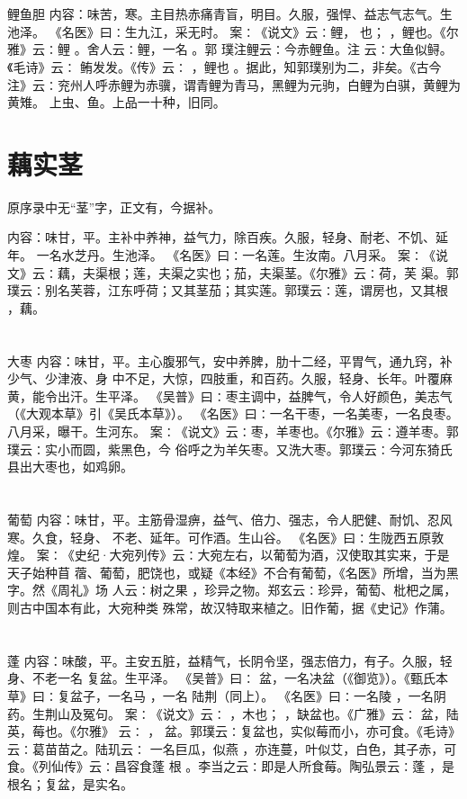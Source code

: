 \documentclass[12pt,UTF8]{ctexbook}
\begin{document}
\section{}鲤鱼胆
内容：味苦，寒。主目热赤痛青盲，明目。久服，强悍、益志气志气。生池泽。 
《名医》曰∶生九江，采无时。 
案∶《说文》云∶鲤， 也； ，鲤也。《尔雅》云∶鲤 。舍人云∶鲤，一名 。郭 
璞注鲤云∶今赤鲤鱼。注 云∶大鱼似鲟。《毛诗》云∶ 鲔发发。《传》云∶ ，鲤也 
。据此，知郭璞别为二，非矣。《古今 
注》云∶兖州人呼赤鲤为赤骥，谓青鲤为青马，黑鲤为元驹，白鲤为白骐，黄鲤为黄雉。 
上虫、鱼。上品一十种，旧同。 


\section{藕实茎}

原序录中无“茎”字，正文有，今据补。

内容：味甘，平。主补中养神，益气力，除百疾。久服，轻身、耐老、不饥、延年。 
一名水芝丹。生池泽。 
《名医》曰∶一名莲。生汝南。八月采。 
案∶《说文》云∶藕，夫渠根；莲，夫渠之实也；茄，夫渠茎。《尔雅》云∶荷，芙 
渠。郭璞云∶别名芙蓉，江东呼荷；又其茎茄；其实莲。郭璞云∶莲，谓房也，又其根 
，藕。 


\section{}大枣
内容：味甘，平。主心腹邪气，安中养脾，肋十二经，平胃气，通九窍，补少气、少津液、身 
中不足，大惊，四肢重，和百药。久服，轻身、长年。叶覆麻黄，能令出汗。生平泽。 
《吴普》曰∶枣主调中，益脾气，令人好颜色，美志气（《大观本草》引《吴氏本草》）。 
《名医》曰∶一名干枣，一名美枣，一名良枣。八月采，曝干。生河东。 
案∶《说文》云∶枣，羊枣也。《尔雅》云∶遵羊枣。郭璞云∶实小而圆，紫黑色，今 
俗呼之为羊矢枣。又洗大枣。郭璞云∶今河东猗氏县出大枣也，如鸡卵。 


\section{}葡萄
内容：味甘，平。主筋骨湿痹，益气、倍力、强志，令人肥健、耐饥、忍风寒。久食，轻身、 
不老、延年。可作酒。生山谷。 
《名医》曰∶生陇西五原敦煌。 
案∶《史纪·大宛列传》云∶大宛左右，以葡萄为酒，汉使取其实来，于是天子始种苜 
蓿、葡萄，肥饶也，或疑《本经》不合有葡萄，《名医》所增，当为黑字。然《周礼》场 
人云∶树之果 ，珍异之物。郑玄云∶珍异，葡萄、枇杷之属，则古中国本有此，大宛种类 
殊常，故汉特取来植之。旧作葡，据《史记》作蒲。 


\section{}蓬
内容：味酸，平。主安五脏，益精气，长阴令坚，强志倍力，有子。久服，轻身、不老一名 
复盆。生平泽。 
《吴普》曰∶ 盆，一名决盆（《御览》）。《甄氏本草》曰∶复盆子，一名马 ，一名 
陆荆（同上）。 
《名医》曰∶一名陵 ，一名阴药。生荆山及冤句。 
案∶《说文》云∶ ，木也； ，缺盆也。《广雅》云∶ 盆，陆英，莓也。《尔雅》 
云∶ ， 盆。郭璞云∶复盆也，实似莓而小，亦可食。《毛诗》云∶葛苗苗之。陆玑云∶ 
一名巨瓜，似燕 ，亦连蔓，叶似艾，白色，其子赤，可食。《列仙传》云∶昌容食蓬 根 
。李当之云∶即是人所食莓。陶弘景云∶蓬 ，是根名；复盆，是实名。 
\end{document}
